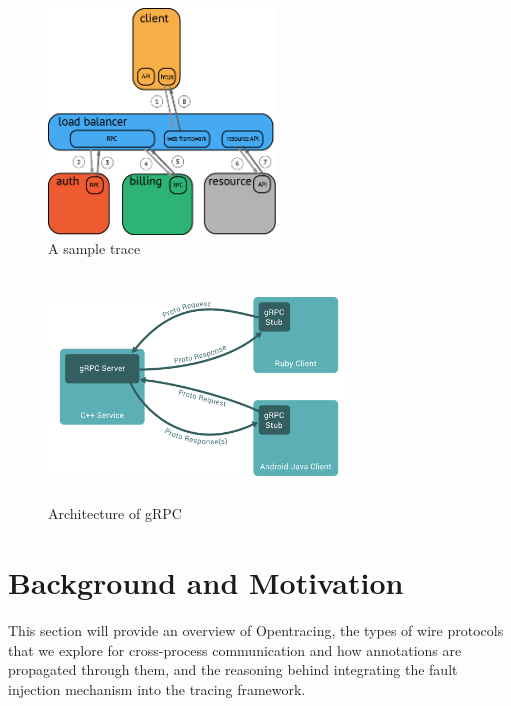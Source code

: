 

\begin{figure}
\centering
\includegraphics[width=\textwidth,height=6cm,keepaspectratio=true]{basic_trace}
\caption{A sample trace}
\label{basic_trace}
\end{figure}

\begin{figure}
\centering
\includegraphics[width=8cm,height=6cm,keepaspectratio=true]{grpc_arch}
\caption{Architecture of gRPC}
\label{grpc_arch}
\end{figure}


\section{Background and Motivation}
This section will provide an overview of Opentracing, the 
types of wire protocols that we explore for cross-process communication
and how annotations are propagated through them, and the reasoning behind 
integrating the fault injection mechanism into the tracing framework. 

